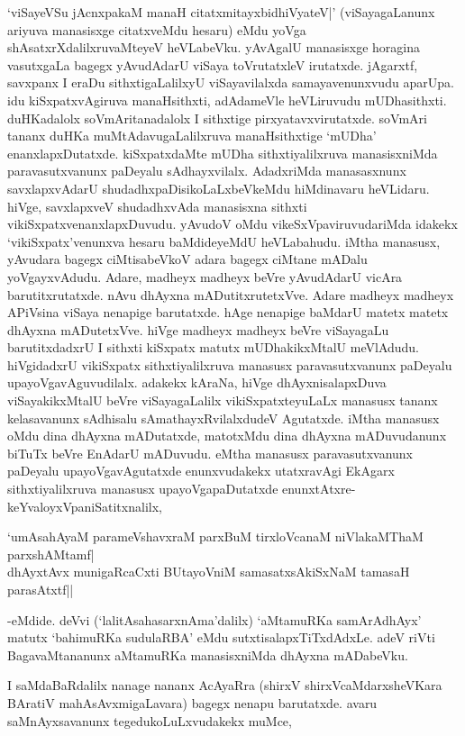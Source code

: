 `viSayeVSu jAcnxpakaM manaH citatxmitayxbidhiVyateV|' (viSayagaLanunx ariyuva manasisxge citatxveMdu hesaru) eMdu yoVga shAsatxrXdalilxruvaMteyeV heVLabeVku. yAvAgalU manasisxge horagina vasutxgaLa bagegx yAvudAdarU viSaya toVrutatxleV irutatxde. jAgarxtf, savxpanx I eraDu sithxtigaLalilxyU viSayavilalxda samayavenunxvudu aparUpa. idu kiSxpatxvAgiruva manaHsithxti, adAdameVle heVLiruvudu mUDhasithxti. duHKadalolx soVmAritanadalolx I sithxtige pirxyatavxvirutatxde. soVmAri tananx duHKa muMtAdavugaLalilxruva manaHsithxtige `mUDha' enanxlapxDutatxde. kiSxpatxdaMte mUDha sithxtiyalilxruva manasisxniMda paravasutxvanunx paDeyalu sAdhayxvilalx. AdadxriMda manasasxnunx savxlapxvAdarU shudadhxpaDisikoLaLxbeVkeMdu hiMdinavaru heVLidaru. hiVge, savxlapxveV shudadhxvAda manasisxna sithxti vikiSxpatxvenanxlapxDuvudu. yAvudoV oMdu vikeSxVpaviruvudariMda idakekx `vikiSxpatx'venunxva hesaru baMdideyeMdU heVLabahudu. iMtha manasusx, yAvudara bagegx ciMtisabeVkoV adara bagegx ciMtane mADalu yoVgayxvAdudu. Adare, madheyx madheyx beVre yAvudAdarU vicAra barutitxrutatxde. nAvu dhAyxna mADutitxrutetxVve. Adare madheyx madheyx APiVsina viSaya nenapige barutatxde. hAge nenapige baMdarU matetx matetx dhAyxna mADutetxVve. hiVge madheyx madheyx beVre viSayagaLu barutitxdadxrU I sithxti kiSxpatx matutx mUDhakikxMtalU meVlAdudu. hiVgidadxrU vikiSxpatx sithxtiyalilxruva manasusx paravasutxvanunx paDeyalu upayoVgavAguvudilalx. adakekx kAraNa, hiVge dhAyxnisalapxDuva viSayakikxMtalU beVre viSayagaLalilx vikiSxpatxteyuLaLx manasusx tananx kelasavanunx sAdhisalu sAmathayxRvilalxdudeV Agutatxde. iMtha manasusx oMdu dina dhAyxna mADutatxde, matotxMdu dina dhAyxna mADuvudanunx biTuTx beVre EnAdarU mADuvudu. eMtha manasusx paravasutxvanunx paDeyalu upayoVgavAgutatxde enunxvudakekx utatxravAgi EkAgarx sithxtiyalilxruva manasusx upayoVgapaDutatxde enunxtAtxre-keYvaloyxVpaniSatitxnalilx,

\begin{shloka}
`umAsahAyaM parameVshavxraM parxBuM tirxloVcanaM niVlakaMThaM parxshAMtamf|\\
dhAyxtAvx munigaRcaCxti BUtayoVniM samasatxsAkiSxNaM tamasaH parasAtxtf||
\end{shloka}

-eMdide. deVvi (`lalitAsahasarxnAma'dalilx) `aMtamuRKa samArAdhAyx' matutx `bahimuRKa sudulaRBA' eMdu sutxtisalapxTiTxdAdxLe. adeV riVti BagavaMtananunx aMtamuRKa manasisxniMda dhAyxna mADabeVku.

I saMdaBaRdalilx nanage nananx AcAyaRra (shirxV shirxVcaMdarxsheVKara BAratiV mahAsAvxmigaLavara) bagegx nenapu barutatxde. avaru saMnAyxsavanunx tegedukoLuLxvudakekx muMce,

